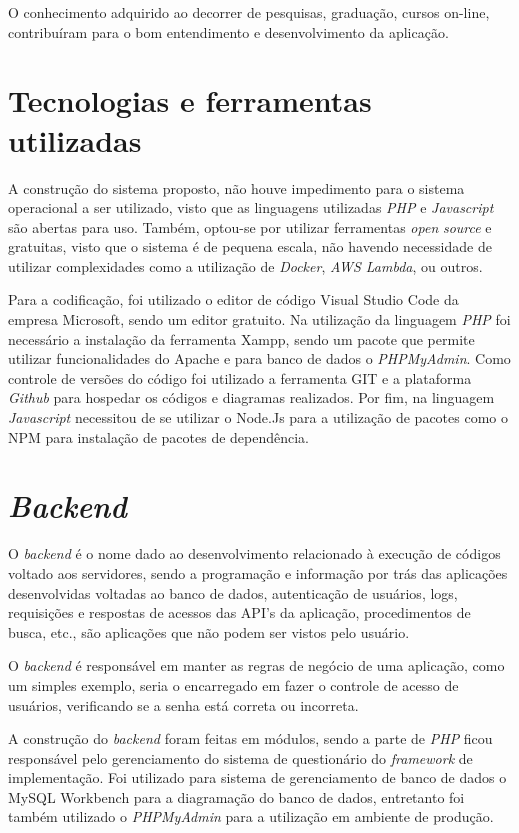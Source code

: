 \documentclass[
	12pt,				%
	openright,			%
	oneside,			%
	a4paper,			%
	english,			%
	french,				%
	spanish,			%
	brazil,				%
	]{abntex2}
\begin{document}
O conhecimento adquirido ao decorrer de pesquisas, graduação, cursos on-line, contribuíram para o bom entendimento e desenvolvimento da aplicação.


\section{Tecnologias e ferramentas utilizadas}

A construção do sistema proposto, não houve impedimento para o sistema operacional a ser utilizado, visto que as linguagens utilizadas \textit{PHP} e \textit{Javascript} são abertas para uso. Também, optou-se por utilizar ferramentas \textit{open} \textit{source} e gratuitas, visto que o sistema é de pequena escala, não havendo necessidade de utilizar complexidades como a utilização de \textit{Docker}, \textit{AWS Lambda}, ou outros.

Para a codificação, foi utilizado o editor de código Visual Studio Code da empresa Microsoft, sendo um editor gratuito. Na utilização da linguagem \textit{PHP} foi necessário a instalação da ferramenta Xampp, sendo um pacote que permite utilizar funcionalidades do Apache e para banco de dados o \textit{PHPMyAdmin}. Como controle de versões do código foi utilizado a ferramenta GIT e a plataforma \textit{Github} para hospedar os códigos e diagramas realizados. Por fim, na linguagem \textit{Javascript} necessitou de se utilizar o Node.Js para a utilização de pacotes como o NPM para instalação de pacotes de dependência.  

\section{\textit{Backend}}

O \textit{backend} é o nome dado ao desenvolvimento relacionado à execução de códigos voltado aos servidores, sendo a programação e informação por trás das aplicações desenvolvidas voltadas ao banco de dados, autenticação de usuários, logs, requisições e respostas de acessos das API’s da aplicação, procedimentos de busca, etc., são aplicações que não podem ser vistos pelo usuário.

O \textit{backend} é responsável em manter as regras de negócio de uma aplicação, como um simples exemplo, seria o encarregado em fazer o controle de acesso de usuários, verificando se a senha está correta ou incorreta.

A construção do \textit{backend} foram feitas em módulos, sendo a parte de \textit{PHP} ficou responsável pelo gerenciamento do sistema de questionário do \textit{framework} de implementação. Foi utilizado para sistema de gerenciamento de banco de dados o MySQL Workbench para a diagramação do banco de dados, entretanto foi também utilizado o \textit{PHPMyAdmin} para a utilização em ambiente de produção.
\end{document}
